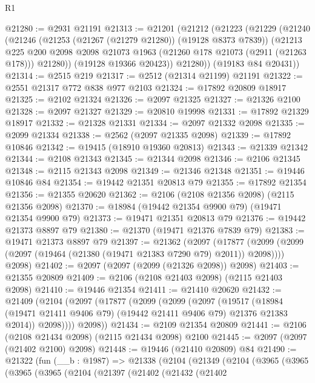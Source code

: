 \begin{lexlean}{R1}
\begin{coremodule}
@21280 := @2931 @21191
@21313 := @21201
    (@21212
      (@21223
        (@21229
          (@21240
            (@21246
              (@21253 (@21267 (@21279 @21280)) (@19128 @8373 @7839))
              (@21213
                @225
                @200
                @2098
                @2098
                @21073
                @1963
                (@21260 @178 @21073 (@2911 (@21263 @178)))
                @21280))
            (@19128 @19366 @20423))
          @21280))
      (@19183 @84 @20431))
@21314 := @2515 @219
@21317 := @2512 (@21314 @21199) @21191
@21322 := @2551 @21317 @772 @838 @977 @2103
@21324 := @17892 @20809 @18917
@21325 := @2102 @21324
@21326 := @2097 @21325
@21327 := @21326 @2100
@21328 := @2097 @21327
@21329 := @20810 @19998
@21331 := @17892 @21329 @18917
@21332 := @21328 @21331
@21334 := @2097 @21332 @2098
@21335 := @2099 @21334
@21338 := @2562 (@2097 @21335 @2098)
@21339 := @17892 @10846
@21342 := @19415 (@18910 @19360 @20813)
@21343 := @21339 @21342
@21344 := @2108 @21343
@21345 := @21344 @2098
@21346 := @2106 @21345
@21348 := @2115 @21343 @2098
@21349 := @21346 @21348
@21351 := @19446 @10846 @84
@21354 := @19442 @21351 @20813 @79
@21355 := @17892 @21354
@21356 := @21355 @20620
@21362 := @2106 (@2108 @21356 @2098) (@2115 @21356 @2098)
@21370 := @18984 (@19442 @21354 @9900 @79) (@19471 @21354 @9900 @79)
@21373 := @19471 @21351 @20813 @79
@21376 := @19442 @21373 @8897 @79
@21380 := @21370 (@19471 @21376 @7839 @79)
@21383 := @19471 @21373 @8897 @79
@21397 := @21362
    (@2097
      (@17877 (@2099 (@2099 (@2097 (@19464 (@21380 (@19471 @21383 @7290 @79) @2011)) @2098))))
      @2098)
@21402 := @2097 (@2097 (@2099 (@21326 @2098)) @2098)
@21403 := @21355 @20809
@21409 := @2106 (@2108 @21403 @2098) (@2115 @21403 @2098)
@21410 := @19446 @21354
@21411 := @21410 @20620
@21432 := @21409
    (@2104
      (@2097
        (@17877
          (@2099
            (@2099
              (@2097
                (@19517
                  (@18984 (@19471 @21411 @9406 @79) (@19442 @21411 @9406 @79) @21376 @21383 @2014))
                @2098))))
        @2098))
@21434 := @2109 @21354 @20809
@21441 := @2106 (@2108 @21434 @2098) (@2115 @21434 @2098) @2100
@21445 := @2097 (@2097 (@21402 @2100) @2098)
@21448 := @19446 (@21410 @20809) @84
@21490 := @21322
    (fun (__b : @1987) =>
    @21338
      (@2104
        (@21349
          (@2104
            (@3965
              (@3965
                (@3965
                  (@3965
                    (@2104
                      (@21397
                        (@21402
                          (@21432
                            (@21402

\end{coremodule}
\end{lexlean}

